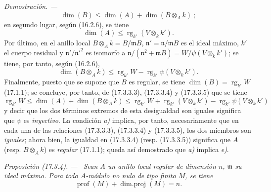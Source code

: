 \documentclass[10pt,oneside]{book}
\makeatletter
\newcommand{\setmanualcurrentlabel}[1]{\def\@currentlabel{#1}}
\newenvironment{proposition}[1][]{%
  \setmanualcurrentlabel{#1}\par\medskip\noindent\itshape Proposición (#1). ---\ }{\par}
\newenvironment{proof}{%
  \par\medskip\noindent\textit{Demostración. ---\ }}{\par}
\providecommand{\setmin}{-}%
\makeatother
\begin{document}
\begin{proof}
\begin{equation}
\tag{17.3.3.3}
  \dim(B)\leq\dim(A)+\dim(B\otimes_A k)~;
\end{equation}
en segundo lugar, según (16.2.6), se tiene
\begin{equation}
\label{0.17.3.3.4-es}
\tag{17.3.3.4}
  \dim(A)\leq\operatorname{rg}_{k'}(V\otimes_k k').
\end{equation}
Por último, en el anillo local $B\otimes_A k=B/\mathfrak{m}B$,
$\mathfrak{n}'=\mathfrak{n}/\mathfrak{m}B$ es el ideal máximo, $k'$ el cuerpo
residual y $\mathfrak{n}'/\mathfrak{n}'^2$ es isomorfo a
$\mathfrak{n}/(\mathfrak{n}^2+\mathfrak{m}B)
=W/\psi(V\otimes_k k')$; se tiene, por tanto, según (16.2.6),
\begin{equation}
\label{0.17.3.3.5-es}
\tag{17.3.3.5}
  \dim(B\otimes_A k)
  \leq\operatorname{rg}_{k'}W
  \setmin\operatorname{rg}_{k'}\psi(V\otimes_k k').
\end{equation}
Finalmente, puesto que se supone que $B$ es regular, se tiene
$\dim(B)=\operatorname{rg}_{k'}W$ (17.1.1); se concluye, por tanto, de
(17.3.3.3), (17.3.3.4) y (17.3.3.5) que se tiene
\[
  \operatorname{rg}_{k'}W
  \leq\dim(A)+\dim(B\otimes_A k)
  \leq\operatorname{rg}_{k'}W
  +\operatorname{rg}_{k'}(V\otimes_k k')
  \setmin\operatorname{rg}_{k'}\psi(V\otimes_k k')
\]
y decir que los dos términos extremos de esta desigualdad son iguales
significa que $\psi$ es \emph{inyectivo}. La condición \emph{a)} implica, por tanto,
necesariamente que en cada una de las relaciones (17.3.3.3), (17.3.3.4) y
(17.3.3.5), los dos miembros son \emph{iguales}; ahora bien, la igualdad en
(17.3.3.4) (resp. (17.3.3.5)) significa que $A$ (resp. $B\otimes_A k$) es
\emph{regular} (17.1.1); queda así demostrado que \emph{a)} implica \emph{e)}.
\end{proof}

\begin{proposition}[17.3.4]
\label{0.17.3.4-es}
Sean $A$ un anillo local regular de dimensión $n$, $\mathfrak{m}$ su ideal
máximo. Para todo $A$-módulo no nulo de tipo finito $M$, se tiene
\begin{equation}
\label{0.17.3.4.1-es}
\tag{17.3.4.1}
  \operatorname{prof}(M)+\operatorname{dim.proj}(M)=n.
\end{equation}
\end{proposition}
\end{document}
